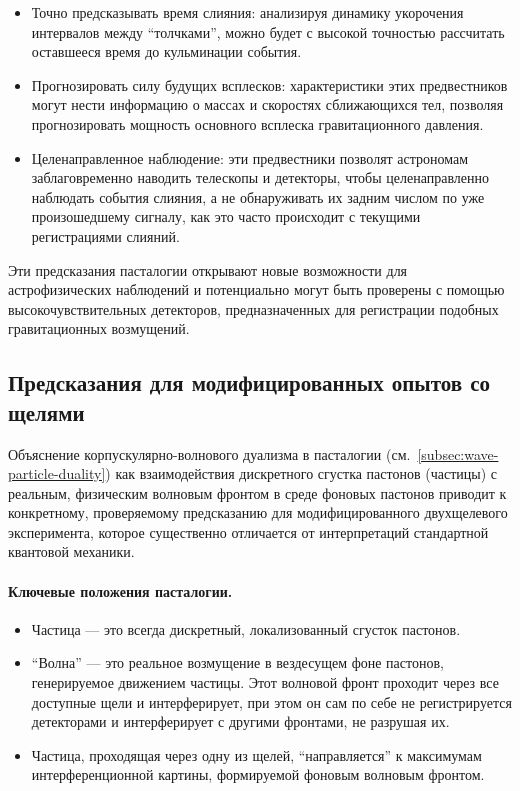 \documentclass[pdflatex,sn-mathphys-num,referee]{sn-jnl}
\begin{document}
\begin{enumerate}
    \begin{itemize}
        \item Точно предсказывать время слияния: анализируя динамику укорочения интервалов между ``толчками'', можно будет с высокой точностью рассчитать оставшееся время до кульминации события.
        \item Прогнозировать силу будущих всплесков: характеристики этих предвестников могут нести информацию о массах и скоростях сближающихся тел, позволяя прогнозировать мощность основного всплеска гравитационного давления.
        \item Целенаправленное наблюдение: эти предвестники позволят астрономам заблаговременно наводить телескопы и детекторы, чтобы целенаправленно наблюдать события слияния, а не обнаруживать их задним числом по уже произошедшему сигналу, как это часто происходит с текущими регистрациями слияний.
    \end{itemize}
\end{enumerate}

Эти предсказания пасталогии открывают новые возможности для астрофизических наблюдений и потенциально могут быть проверены с помощью высокочувствительных детекторов, предназначенных для регистрации подобных гравитационных возмущений.

\subsection{Предсказания для модифицированных опытов со щелями}\label{subsec:slit-experiments}

Объяснение корпускулярно-волнового дуализма в пасталогии (см.~\ref{subsec:wave-particle-duality}) как взаимодействия дискретного сгустка пастонов (частицы) с реальным, физическим волновым фронтом в среде фоновых пастонов приводит к конкретному, проверяемому предсказанию для модифицированного двухщелевого эксперимента, которое существенно отличается от интерпретаций стандартной квантовой механики.

\paragraph{Ключевые положения пасталогии.}
\begin{itemize}
    \item Частица --- это всегда дискретный, локализованный сгусток пастонов.
    \item ``Волна'' --- это реальное возмущение в вездесущем фоне пастонов, генерируемое движением частицы. Этот волновой фронт проходит через все доступные щели и интерферирует, при этом он сам по себе не регистрируется детекторами и интерферирует с другими фронтами, не разрушая их.
    \item Частица, проходящая через одну из щелей, ``направляется'' к максимумам интерференционной картины, формируемой фоновым волновым фронтом.
\end{itemize}
\end{document}
